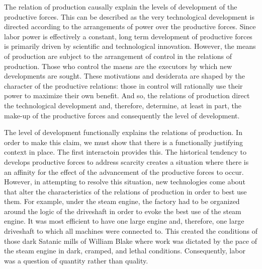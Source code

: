 \documentclass[letterpaper,notitlepage,12pt]{article}
\begin{document}
The relation of production causally explain the levels of development of the
productive forces.
This can be described as the very technological development is directed
according to the arrangements of power over the productive forces.
Since labor power is effectively a constant, long term development of productive
forces is primarily driven by scientific and technological innovation.
However, the means of production are subject to the arrangement of control in
the relations of production.
Those who control the maens are the executors by which new developments are
sought.
These motivations and desiderata are shaped by the character of the productive
relations: those in control will rationally use their power to maximize their
own benefit.
And so, the relations of production direct the technological development and,
therefore, determine, at least in part, the make-up of the productive forces and
consequently the level of development.

The level of development functionally explains the relations of production.
In order to make this claim, we must show that there is a functionally
justifying context in place.
The first interactoin provides this.
The historical tendency to develops productive forces to address scarcity
creates a situation where there is an affinity for the effect of the advancement
of the productive forces to occur.
However, in attempting to resolve this situation, new technologies come about
that alter the characteristics of the relations of production in order to best
use them.
For example, under the steam engine, the factory had to be organized around the
logic of the driveshaft in order to evoke the best use of the steam engine.
It was most efficient to have one large engine and, therefore, one large
driveshaft to which all machines were connected to.
This created the conditions of those dark Satanic mills of William Blake where
work was dictated by the pace of the steam engine in dark, cramped, and lethal
conditions.
Consequently, labor was a question of quantity rather than quality.
\end{document}
